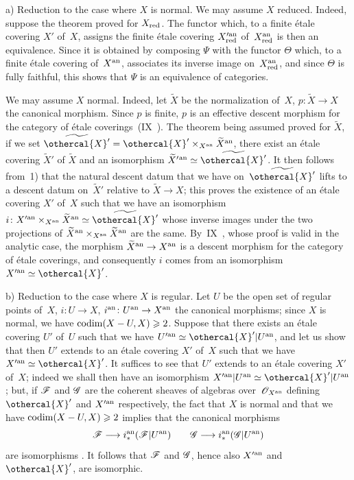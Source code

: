 a) Reduction to the case where $X$ is normal. We may assume $X$
reduced. Indeed, suppose the theorem proved
for $X_{\mathrm{red}}$. The functor which, to a finite \'etale
covering $X'$ of~$X$, assigns the finite \'etale covering
$X^{\prime\mathrm{an}}_{\mathrm{red}}$ of~$X_{\mathrm{red}}^{\mathrm{an}}$ is then an equivalence.
Since it is obtained by composing $\Psi$ with the functor $\Theta$ which,
to a finite \'etale covering of~$X^{\mathrm{an}}$, associates its inverse
image on~$X_{\mathrm{red}}^{\mathrm{an}}$, and since $\Theta$ is fully
faithful, this shows that $\Psi$ is an equivalence of
categories.

We
may assume $X$ normal. Indeed, let $\widetilde{X}$ be the
normalization of~$X$, $p\colon\widetilde{X}\to X$ the canonical
morphism. Since $p$ is finite, $p$ is an effective descent
morphism for the category of \'etale
coverings~(IX~). The theorem being
assumed proved for $\widetilde{X}$, if we set
$\widetilde{\othercal{X}'}=\othercal{X}'\times_{X^{\an}}\widetilde{X}^{\an}$,
there exist an \'etale covering $\widetilde{X}'$ of
$\widetilde{X}$ and an isomorphism $\widetilde{X}'{}^{\an}\simeq
\widetilde{\othercal{X}'}$. It then follows from~1) that the natural
descent datum that we have on~$\widetilde{\othercal{X}'}$
lifts to a descent datum on~$\widetilde{X}'$
relative to $\widetilde{X}\to X$; this proves the existence of an
\'etale covering $X'$ of~$X$ such that we have an isomorphism
$i\colon X^{\prime\an}\times_{X^{\an}}\widetilde{X}^{\an} \simeq
\widetilde{\othercal{X}'}$ whose inverse images under the two
projections of
$\widetilde{X}^{\mathrm{an}}\times_{X^{\mathrm{an}}}\widetilde{X}^{\mathrm{an}}$ are the
same. By~IX~, whose proof is
valid in the analytic case, the morphism $\widetilde{X}^{\an}\to
X^{\an}$ is a descent morphism for the category of
\'etale coverings, and consequently $i$ comes from an
isomorphism $X^{\prime\an}\simeq
\othercal{X}'$.

b) Reduction to the case where $X$ is regular. Let $U$ be
the open set of regular points of~$X$, $i\colon U\to X$,
$i^{\an}\colon U^{\an}\to X^{\an}$ the canonical morphisms; since
$X$ is normal, we have $\operatorname{codim}(X-U,X)\geqslant 2$. Suppose that there exists an
\'etale covering $U'$ of~$U$ such that we have
$U^{\prime\an}\simeq \othercal{X}'|U^{\an}$, and let us show that then $U'$
extends to an \'etale covering $X'$ of~$X$ such that we have
$X^{\prime\an}\simeq \othercal{X}'$. It suffices to see that $U'$ extends
to an \'etale covering $X'$ of~$X$; indeed we shall then have an
isomorphism $X^{\prime\an}|U^{\an}\simeq \othercal{X}'|U^{\an}$; but, if
$\cal{F}$ and $\cal{G}$ are the coherent sheaves of algebras
over~$\cal{O}_{X^{\an}}$ defining $\othercal{X}'$ and
$X^{\prime\mathrm{an}}$ respectively, the fact that $X$ is normal and that we have
$\operatorname{codim}(X-U,X)\geqslant 2$ implies that the canonical morphisms
$$
\cal{F}\to i_*^{\an}(\cal{F}|U^{\an}) \qquad
\cal{G}\to i_*^{\an}(\cal{G}|U^{\an})
$$
are
isomorphisms \cite[~prop]{XII.11}. It follows that $\cal{F}$
and $\cal{G}$, hence also $X^{\prime\mathrm{an}}$ and $\othercal{X}'$, are isomorphic.


